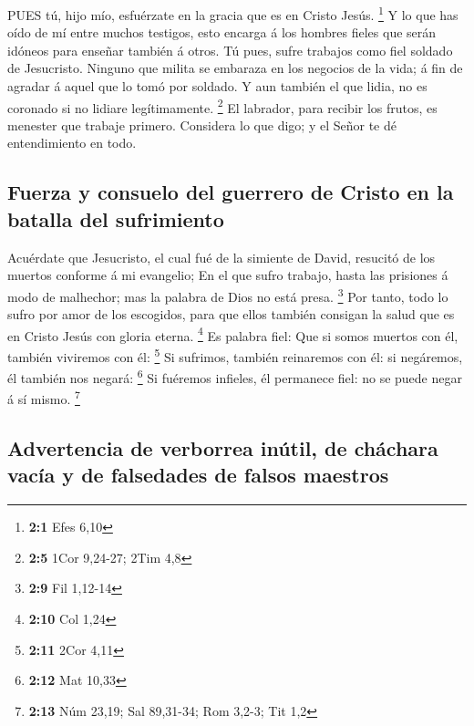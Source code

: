  PUES tú, hijo mío, esfuérzate en la gracia que es en Cristo
Jesús. \footnote{\textbf{2:1} Efes 6,10}  Y lo que has oído
de mí entre muchos testigos, esto encarga á los hombres fieles que serán
idóneos para enseñar también á otros.  Tú pues, sufre
trabajos como fiel soldado de Jesucristo.  Ninguno que
milita se embaraza en los negocios de la vida; á fin de agradar á aquel
que lo tomó por soldado.  Y aun también el que lidia, no es
coronado si no lidiare legítimamente. \footnote{\textbf{2:5} 1Cor
  9,24-27; 2Tim 4,8}  El labrador, para recibir los frutos,
es menester que trabaje primero.  Considera lo que digo; y
el Señor te dé entendimiento en todo.

\hypertarget{fuerza-y-consuelo-del-guerrero-de-cristo-en-la-batalla-del-sufrimiento}{%
\subsection{Fuerza y \hspace{0pt}\hspace{0pt}consuelo del guerrero de
Cristo en la batalla del
sufrimiento}\label{fuerza-y-consuelo-del-guerrero-de-cristo-en-la-batalla-del-sufrimiento}}

 Acuérdate que Jesucristo, el cual fué de la simiente de
David, resucitó de los muertos conforme á mi evangelio;  En
el que sufro trabajo, hasta las prisiones á modo de malhechor; mas la
palabra de Dios no está presa. \footnote{\textbf{2:9} Fil 1,12-14}
 Por tanto, todo lo sufro por amor de los escogidos, para
que ellos también consigan la salud que es en Cristo Jesús con gloria
eterna. \footnote{\textbf{2:10} Col 1,24}  Es palabra fiel:
Que si somos muertos con él, también viviremos con él: \footnote{\textbf{2:11}
  2Cor 4,11}  Si sufrimos, también reinaremos con él: si
negáremos, él también nos negará: \footnote{\textbf{2:12} Mat 10,33}
 Si fuéremos infieles, él permanece fiel: no se puede negar
á sí mismo. \footnote{\textbf{2:13} Núm 23,19; Sal 89,31-34; Rom 3,2-3;
  Tit 1,2}

\hypertarget{advertencia-de-verborrea-inuxfatil-de-chuxe1chara-vacuxeda-y-de-falsedades-de-falsos-maestros}{%
\subsection{Advertencia de verborrea inútil, de cháchara vacía y de
falsedades de falsos
maestros}\label{advertencia-de-verborrea-inuxfatil-de-chuxe1chara-vacuxeda-y-de-falsedades-de-falsos-maestros}}

